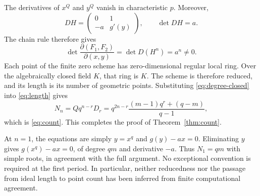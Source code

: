 The derivatives of $x^Q$ and $y^Q$ vanish in characteristic $p$.
Moreover,
\[
 DH=\begin{pmatrix}0&1\\-a&g'(y)\end{pmatrix},\qquad
 \det DH=a.
\]
The chain rule therefore gives
\begin{equation}\label{eq:jacobian}
 \det\frac{\partial(F_1,F_2)}{\partial(x,y)}
 =\det D(H^n)=a^n\ne0.
\end{equation}
Each point of the finite zero scheme has zero-dimensional regular
local ring. Over the algebraically closed field $K$, that ring is $K$.
The scheme is therefore reduced, and its length is its number of
geometric points. Substituting \eqref{eq:degree-closed} into
\eqref{eq:length} gives
\[
 N_n=Qq^{n-r}D_r
 =q^{2n-r}\frac{(m-1)q^r+(q-m)}{q-1},
\]
which is \eqref{eq:count}. This completes the proof of
Theorem~\ref{thm:count}.

At $n=1$, the equations are simply $y=x^q$ and $g(y)-ax=0$.
Eliminating $y$ gives $g(x^q)-ax=0$, of degree $qm$ and derivative
$-a$. Thus $N_1=qm$ with simple roots, in agreement with the full
argument. No exceptional convention is required at the first period.
In particular, neither reducedness nor the passage from ideal length
to point count has been inferred from finite computational agreement.
